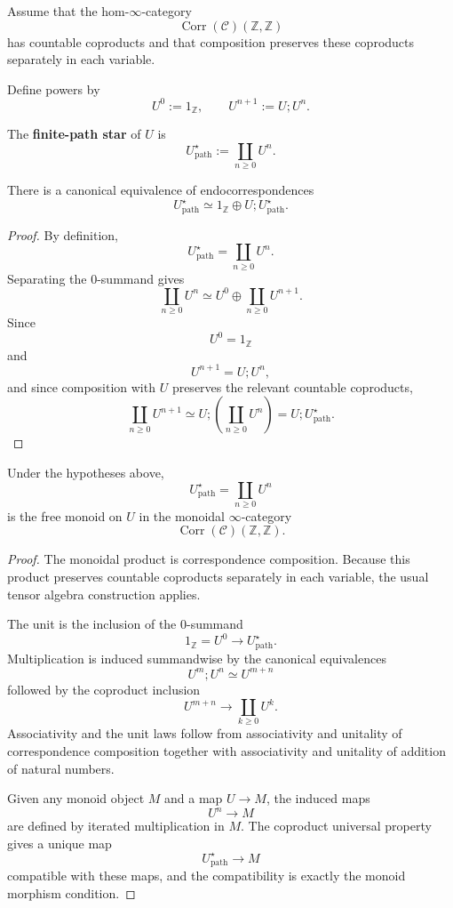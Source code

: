 Assume that the hom-\(\infty\)-category
\[
\operatorname{Corr}(\mathcal C)(\mathbb Z,\mathbb Z)
\]
has countable coproducts and that composition preserves these coproducts
separately in each variable.

Define powers by
\[
U^0:=1_{\mathbb Z},
\qquad
U^{n+1}:=U;U^n.
\]

\begin{definition}
\label{def:derived-path-star}
The \textbf{finite-path star} of \(U\) is
\[
U^\star_{\mathrm{path}}
:=
\coprod_{n\ge0}U^n.
\]
\end{definition}

\begin{proposition}
\label{prop:derived-path-star-equation}
There is a canonical equivalence of endocorrespondences
\[
U^\star_{\mathrm{path}}
\simeq
1_{\mathbb Z}\oplus U;U^\star_{\mathrm{path}}.
\]
\end{proposition}

\begin{proof}
By definition,
\[
U^\star_{\mathrm{path}}
=
\coprod_{n\ge0}U^n.
\]
Separating the \(0\)-summand gives
\[
\coprod_{n\ge0}U^n
\simeq
U^0\oplus\coprod_{n\ge0}U^{n+1}.
\]
Since
\[
U^0=1_{\mathbb Z}
\]
and
\[
U^{n+1}=U;U^n,
\]
and since composition with \(U\) preserves the relevant countable coproducts,
\[
\coprod_{n\ge0}U^{n+1}
\simeq
U;\left(\coprod_{n\ge0}U^n\right)
=
U;U^\star_{\mathrm{path}}.
\]
\end{proof}

\begin{theorem}
\label{thm:derived-path-star-free-monoid}
Under the hypotheses above,
\[
U^\star_{\mathrm{path}}
=
\coprod_{n\ge0}U^n
\]
is the free monoid on \(U\) in the monoidal \(\infty\)-category
\[
\operatorname{Corr}(\mathcal C)(\mathbb Z,\mathbb Z).
\]
\end{theorem}

\begin{proof}
The monoidal product is correspondence composition. Because this product
preserves countable coproducts separately in each variable, the usual tensor
algebra construction applies.

The unit is the inclusion of the \(0\)-summand
\[
1_{\mathbb Z}=U^0\to U^\star_{\mathrm{path}}.
\]
Multiplication is induced summandwise by the canonical equivalences
\[
U^m;U^n\simeq U^{m+n}
\]
followed by the coproduct inclusion
\[
U^{m+n}\to \coprod_{k\ge0}U^k.
\]
Associativity and the unit laws follow from associativity and unitality of
correspondence composition together with associativity and unitality of
addition of natural numbers.

Given any monoid object \(M\) and a map \(U\to M\), the induced maps
\[
U^n\to M
\]
are defined by iterated multiplication in \(M\). The coproduct universal
property gives a unique map
\[
U^\star_{\mathrm{path}}\to M
\]
compatible with these maps, and the compatibility is exactly the monoid
morphism condition.
\end{proof}


